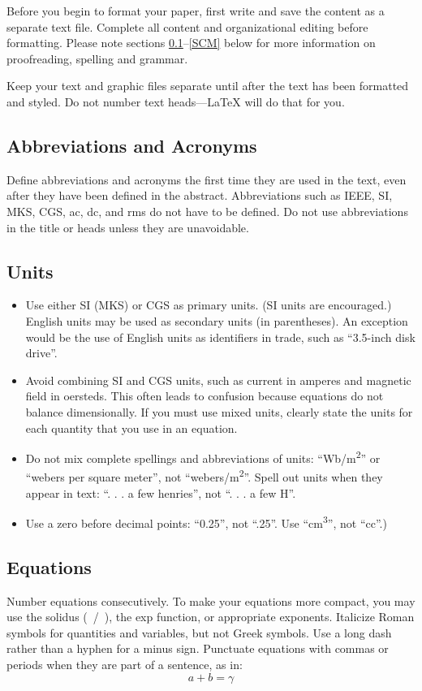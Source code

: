 \documentclass[conference]{IEEEtran}
\begin{document}
Before you begin to format your paper, first write and save the content as a 
separate text file. Complete all content and organizational editing before 
formatting. Please note sections \ref{AA}--\ref{SCM} below for more information on 
proofreading, spelling and grammar.

Keep your text and graphic files separate until after the text has been 
formatted and styled. Do not number text heads---{\LaTeX} will do that 
for you.

\subsection{Abbreviations and Acronyms}\label{AA}
Define abbreviations and acronyms the first time they are used in the text, 
even after they have been defined in the abstract. Abbreviations such as 
IEEE, SI, MKS, CGS, ac, dc, and rms do not have to be defined. Do not use 
abbreviations in the title or heads unless they are unavoidable.

\subsection{Units}
\begin{itemize}
\item Use either SI (MKS) or CGS as primary units. (SI units are encouraged.) English units may be used as secondary units (in parentheses). An exception would be the use of English units as identifiers in trade, such as ``3.5-inch disk drive''.
\item Avoid combining SI and CGS units, such as current in amperes and magnetic field in oersteds. This often leads to confusion because equations do not balance dimensionally. If you must use mixed units, clearly state the units for each quantity that you use in an equation.
\item Do not mix complete spellings and abbreviations of units: ``Wb/m\textsuperscript{2}'' or ``webers per square meter'', not ``webers/m\textsuperscript{2}''. Spell out units when they appear in text: ``. . . a few henries'', not ``. . . a few H''.
\item Use a zero before decimal points: ``0.25'', not ``.25''. Use ``cm\textsuperscript{3}'', not ``cc''.)
\end{itemize}

\subsection{Equations}
Number equations consecutively. To make your 
equations more compact, you may use the solidus (~/~), the exp function, or 
appropriate exponents. Italicize Roman symbols for quantities and variables, 
but not Greek symbols. Use a long dash rather than a hyphen for a minus 
sign. Punctuate equations with commas or periods when they are part of a 
sentence, as in:
\begin{equation}
a+b=\gamma\label{eq}
\end{equation}
\end{document}
